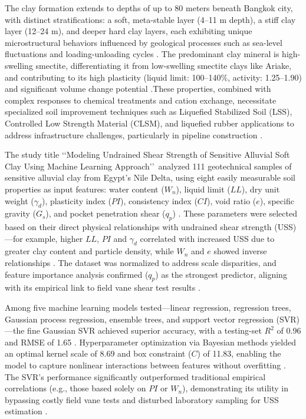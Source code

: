 \documentclass[12pt,a4paper]{article}
\begin{document}
	The clay formation extends to depths of up to 80 meters beneath Bangkok city, with distinct stratifications: a soft, meta-stable layer (4–11 m depth), a stiff clay layer (12–24 m), and deeper hard clay layers, each exhibiting unique microstructural behaviors influenced by geological processes such as sea-level fluctuations and loading-unloading cycles \cite{Krit_Saowiang_Pham_Huy_Giao_2019}. The predominant clay mineral is high-swelling smectite, differentiating it from low-swelling smectite clays like Ariake, and contributing to its high plasticity (liquid limit: 100–140\%, activity: 1.25–1.90) and significant volume change potential \cite{OHTSUBO200011}.These properties, combined with complex responses to chemical treatments and cation exchange, necessitate specialized soil improvement techniques such as Liquefied Stabilized Soil (LSS), Controlled Low Strength Material (CLSM), and liquefied rubber applications to address infrastructure challenges, particularly in pipeline construction \cite{Prum_Jumnongpol_Eamchotchawalit_Kantiwattanakul_Sooksatra_Jarearnsiri_Passananon_2019}.
	
	The study title \lq\lq Modeling Undrained Shear Strength of Sensitive Alluvial Soft Clay Using Machine Learning Approach\rq\rq\ analyzed 111 geotechnical samples of sensitive alluvial clay from Egypt's Nile Delta, using eight easily measurable soil properties as input features: water content ($W_n$), liquid limit ($LL$), dry unit weight ($\gamma_d$), plasticity index ($PI$), consistency index ($CI$), void ratio ($e$), specific gravity ($G_s$), and pocket penetration shear ($q_p$) \cite{app121910177}. These parameters were selected based on their direct physical relationships with undrained shear strength (USS)—for example, higher $LL$, $PI$ and $\gamma_d$ correlated with increased USS due to greater clay content and particle density, while $W_n$ and $e$ showed inverse relationships \cite{app121910177}. The dataset was normalized to address scale disparities, and feature importance analysis confirmed ($q_p$) as the strongest predictor, aligning with its empirical link to field vane shear test results \cite{app121910177}.
	
	Among five machine learning models tested—linear regression, regression trees, Gaussian process regression, ensemble trees, and support vector regression (SVR)—the fine Gaussian SVR achieved superior accuracy, with a testing-set $R^2$ of 0.96 and RMSE of 1.65 \cite{app121910177}. Hyperparameter optimization via Bayesian methods yielded an optimal kernel scale of 8.69 and box constraint ($C$) of 11.83, enabling the model to capture nonlinear interactions between features without overfitting \cite{app121910177}. The SVR’s performance significantly outperformed traditional empirical correlations (e.g., those based solely on $PI$ or $W_n$), demonstrating its utility in bypassing costly field vane tests and disturbed laboratory sampling for USS estimation \cite{app121910177}.
	
\end{document}
